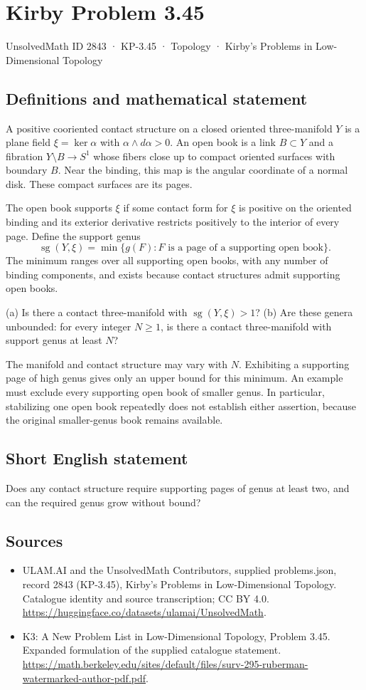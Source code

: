 \documentclass[11pt,a4paper]{article}
\begin{document}
\section*{Kirby Problem 3.45}\label{2843}
{\small UnsolvedMath ID 2843 · KP-3.45 · Topology · Kirby's Problems in Low-Dimensional Topology}
\subsection{Definitions and mathematical statement}
A positive cooriented contact structure on a closed oriented three-manifold $Y$ is a plane field $\xi=\ker\alpha$ with $\alpha\wedge d\alpha>0$. An open book is a link $B\subset Y$ and a fibration $Y\setminus B\to S^1$ whose fibers close up to compact oriented surfaces with boundary $B$. Near the binding, this map is the angular coordinate of a normal disk. These compact surfaces are its pages.

The open book supports $\xi$ if some contact form for $\xi$ is positive on the oriented binding and its exterior derivative restricts positively to the interior of every page. Define the support genus
\[
\operatorname{sg}(Y,\xi)=\min\{g(F):F\text{ is a page of a supporting open book}\}.
\]
The minimum ranges over all supporting open books, with any number of binding components, and exists because contact structures admit supporting open books.

(a) Is there a contact three-manifold with $\operatorname{sg}(Y,\xi)>1$? (b) Are these genera unbounded: for every integer $N\ge1$, is there a contact three-manifold with support genus at least $N$?

The manifold and contact structure may vary with $N$. Exhibiting a supporting page of high genus gives only an upper bound for this minimum. An example must exclude every supporting open book of smaller genus. In particular, stabilizing one open book repeatedly does not establish either assertion, because the original smaller-genus book remains available.
\subsection{Short English statement}
Does any contact structure require supporting pages of genus at least two, and can the required genus grow without bound?
\subsection{Sources}
\begin{itemize}
\item[S1] ULAM.AI and the UnsolvedMath Contributors, supplied problems.json, record 2843 (KP-3.45), Kirby's Problems in Low-Dimensional Topology. Catalogue identity and source transcription; CC BY 4.0.
\url{https://huggingface.co/datasets/ulamai/UnsolvedMath}.
\item[S2] K3: A New Problem List in Low-Dimensional Topology, Problem 3.45. Expanded formulation of the supplied catalogue statement.
\url{https://math.berkeley.edu/sites/default/files/surv-295-ruberman-watermarked-author-pdf.pdf}.
\end{itemize}
\end{document}
